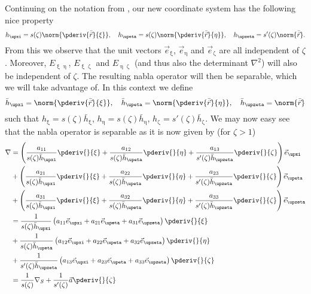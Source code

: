 Continuing on the notation from , our new coordinate system has the following nice property
\begin{equation*}
	h_{\upxi} = s(\zeta)\norm{\pderiv{\bar{\vec{r}}}{\xi}},\quad h_{\upeta} = s(\zeta)\norm{\pderiv{\bar{\vec{r}}}{\eta}},\quad h_{\upzeta} = s'(\zeta)\norm{\bar{\vec{r}}}.
\end{equation*}
From this we observe that the unit vectors $\vec{e}_{\upxi}$, $\vec{e}_{\upeta}$ and $\vec{e}_{\upzeta}$ are all independent of $\zeta$. Moreover, $E_{\upxi\upeta}$, $E_{\upxi\upzeta}$ and $E_{\upeta\upzeta}$ (and thus also the determinant $\nabla^2$) will also be independent of $\zeta$. The resulting nabla operator will then be separable, which we will take advantage of. In this context we define 
\begin{equation*}
	\bar{h}_{\upxi} = \norm{\pderiv{\bar{\vec{r}}}{\xi}}, \quad \bar{h}_{\upeta} = \norm{\pderiv{\bar{\vec{r}}}{\eta}},\quad \bar{h}_{\upzeta} = \norm{\bar{\vec{r}}}
\end{equation*}
such that $h_{\upxi} = s(\zeta)\bar{h}_{\upxi}$, $h_{\upeta} = s(\zeta)\bar{h}_{\upeta}$, $h_{\upzeta} = s'(\zeta)\bar{h}_{\upzeta}$. We may now easy see that the nabla operator is separable as it is now given by (for $\zeta>1$)
\begin{align*}
	\nabla &= \left(\frac{a_{11}}{s(\zeta)\bar{h}_{\upxi}}\pderiv{}{\xi} + \frac{a_{12}}{s(\zeta)\bar{h}_{\upeta}}\pderiv{}{\eta} + \frac{a_{13}}{s'(\zeta)\bar{h}_{\upzeta}}\pderiv{}{\zeta}\right)\vec{e}_{\upxi}\\
	 &+\left(\frac{a_{21}}{s(\zeta)\bar{h}_{\upxi}}\pderiv{}{\xi} + \frac{a_{22}}{s(\zeta)\bar{h}_{\upeta}}\pderiv{}{\eta} + \frac{a_{23}}{s'(\zeta)\bar{h}_{\upzeta}}\pderiv{}{\zeta}\right)\vec{e}_{\upeta}\\
	 &+ \left(\frac{a_{31}}{s(\zeta)\bar{h}_{\upxi}}\pderiv{}{\xi} + \frac{a_{32}}{s(\zeta)\bar{h}_{\upeta}}\pderiv{}{\eta} + \frac{a_{33}}{s'(\zeta)\bar{h}_{\upzeta}}\pderiv{}{\zeta}\right)\vec{e}_{\upzeta}\\
	 &= \frac{1}{s(\zeta) \bar{h}_{\upxi}}\left(a_{11}\vec{e}_{\upxi} + a_{21} \vec{e}_{\upeta} + a_{31}\vec{e}_{\upzeta}\right)\pderiv{}{\xi}\\
	 &+\frac{1}{s(\zeta)\bar{h}_{\upeta}}\left(a_{12}\vec{e}_{\upxi} + a_{22} \vec{e}_{\upeta} + a_{32}\vec{e}_{\upzeta}\right)\pderiv{}{\eta}\\
	 &+\frac{1}{s'(\zeta)\bar{h}_{\upzeta}}\left(a_{13}\vec{e}_{\upxi} + a_{23} \vec{e}_{\upeta} + a_{33}\vec{e}_{\upzeta}\right)\pderiv{}{\zeta}\\
	 &= \frac{1}{s(\zeta)}\nabla_S + \frac{1}{s'(\zeta)}\vec{a}\pderiv{}{\zeta}
\end{align*}
